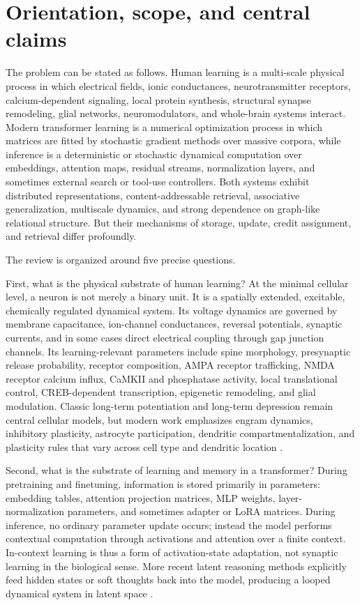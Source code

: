 \documentclass[11pt]{article}
\newcommand{\1}{\mathbf{1}}
\begin{document}
\tableofcontents
\newpage

\section{Orientation, scope, and central claims}

The problem can be stated as follows. Human learning is a multi-scale physical process in which electrical fields, ionic conductances, neurotransmitter receptors, calcium-dependent signaling, local protein synthesis, structural synapse remodeling, glial networks, neuromodulators, and whole-brain systems interact. Modern transformer learning is a numerical optimization process in which matrices are fitted by stochastic gradient methods over massive corpora, while inference is a deterministic or stochastic dynamical computation over embeddings, attention maps, residual streams, normalization layers, and sometimes external search or tool-use controllers. Both systems exhibit distributed representations, content-addressable retrieval, associative generalization, multiscale dynamics, and strong dependence on graph-like relational structure. But their mechanisms of storage, update, credit assignment, and retrieval differ profoundly.

The review is organized around five precise questions.

First, what is the physical substrate of human learning? At the minimal cellular level, a neuron is not merely a binary unit. It is a spatially extended, excitable, chemically regulated dynamical system. Its voltage dynamics are governed by membrane capacitance, ion-channel conductances, reversal potentials, synaptic currents, and in some cases direct electrical coupling through gap junction channels. Its learning-relevant parameters include spine morphology, presynaptic release probability, receptor composition, AMPA receptor trafficking, NMDA receptor calcium influx, CaMKII and phosphatase activity, local translational control, CREB-dependent transcription, epigenetic remodeling, and glial modulation. Classic long-term potentiation and long-term depression remain central cellular models, but modern work emphasizes engram dynamics, inhibitory plasticity, astrocyte participation, dendritic compartmentalization, and plasticity rules that vary across cell type and dendritic location \cite{BlissLomo1973,BiPoo1998,Hayashi2022,Nicoll2023,Choucry2024,Tome2024,Wright2025}.

Second, what is the substrate of learning and memory in a transformer? During pretraining and finetuning, information is stored primarily in parameters: embedding tables, attention projection matrices, MLP weights, layer-normalization parameters, and sometimes adapter or LoRA matrices. During inference, no ordinary parameter update occurs; instead the model performs contextual computation through activations and attention over a finite context. In-context learning is thus a form of activation-state adaptation, not synaptic learning in the biological sense. More recent latent reasoning methods explicitly feed hidden states or soft thoughts back into the model, producing a looped dynamical system in latent space \cite{Vaswani2017,Yun2020,Ramsauer2021,Hao2024,Saunshi2025,SoftCoT2025,ZhuLatentSurvey2025,ZhuOuro2025}.
\end{document}
